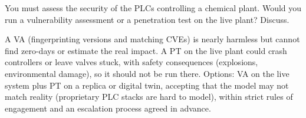\begin{exercise}
You must assess the security of the PLCs controlling a chemical plant. Would you run a vulnerability assessment or a penetration test on the live plant? Discuss.
\end{exercise}
\begin{solution}
A VA (fingerprinting versions and matching CVEs) is nearly harmless but cannot find zero-days or estimate the real impact. A PT on the live plant could crash controllers or leave valves stuck, with safety consequences (explosions, environmental damage), so it should not be run there. Options: VA on the live system plus PT on a replica or digital twin, accepting that the model may not match reality (proprietary PLC stacks are hard to model), within strict rules of engagement and an escalation process agreed in advance.
\end{solution}
